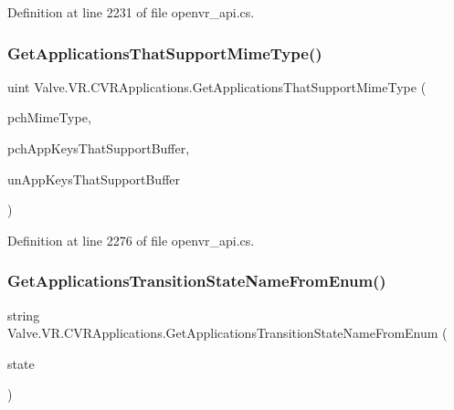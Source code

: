 Definition at line 2231 of file openvr\+\_\+api.\+cs.

\mbox{\label{class_valve_1_1_v_r_1_1_c_v_r_applications_af02538684a9bf0bbdac9e0e956c3b658}} 
\subsubsection{\texorpdfstring{GetApplicationsThatSupportMimeType()}{GetApplicationsThatSupportMimeType()}}
{\footnotesize\ttfamily uint Valve.\+V\+R.\+C\+V\+R\+Applications.\+Get\+Applications\+That\+Support\+Mime\+Type (\begin{DoxyParamCaption}\item[{string}]{pch\+Mime\+Type,  }\item[{System.\+Text.\+String\+Builder}]{pch\+App\+Keys\+That\+Support\+Buffer,  }\item[{uint}]{un\+App\+Keys\+That\+Support\+Buffer }\end{DoxyParamCaption})}



Definition at line 2276 of file openvr\+\_\+api.\+cs.

\mbox{\label{class_valve_1_1_v_r_1_1_c_v_r_applications_a9992ade2dba2f51d2aa4985bc23ceca6}} 
\subsubsection{\texorpdfstring{GetApplicationsTransitionStateNameFromEnum()}{GetApplicationsTransitionStateNameFromEnum()}}
{\footnotesize\ttfamily string Valve.\+V\+R.\+C\+V\+R\+Applications.\+Get\+Applications\+Transition\+State\+Name\+From\+Enum (\begin{DoxyParamCaption}\item[{\mbox{\hyperlink{namespace_valve_1_1_v_r_af00430caae64a19e9ad612ac01a208c0}{E\+V\+R\+Application\+Transition\+State}}}]{state }\end{DoxyParamCaption})}



